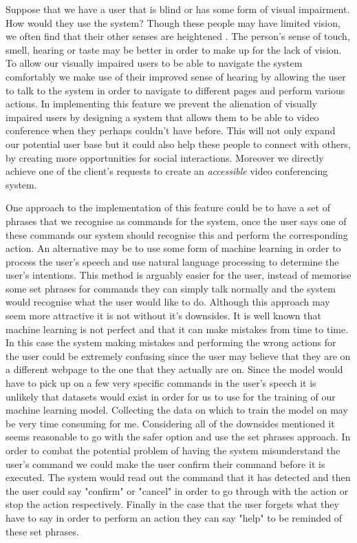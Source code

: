 Suppose that we have a user that is blind or has some form 
of visual impairment. How would they use the system? Though 
these people may have limited vision, we often find that 
their other senses are heightened \cite{blind}. The person's
sense of touch, smell, hearing or taste may be better in order
to make up for the lack of vision. To allow our visually 
impaired users to be able to navigate the system comfortably 
we make use of their improved sense of hearing by allowing the
user to talk to the system in order to navigate to different 
pages and perform various actions. In implementing this 
feature we prevent the alienation of visually impaired users
by designing a system that allows them to be able to video
conference when they perhaps couldn't have before. This will 
not only expand our potential user base but it could also 
help these people to connect with others, by creating more 
opportunities for social interactions. Moreover 
we directly achieve one of the client's requests to create 
an \textit{accessible} video conferencing system. \\
\vspace{0.2cm}

One approach to the implementation of this feature could
be to have a set of phrases that we recognise as commands 
for the system, once 
the user says one of these commands our system should
recognise this and perform the corresponding action. An 
alternative may be to use some form of machine learning in 
order to process the user's speech and use natural language
processing to determine the user's intentions. This method is
arguably easier for the user, instead of memorise some set
phrases for commands they can simply talk normally and the
system would recognise what the user would like to do. 
Although this approach may seem more attractive it is not 
without it's downsides. It is well known that machine 
learning is not perfect and that it can make mistakes from 
time to time. In this case the system making mistakes and
performing the wrong actions for the user could be extremely
confusing since the user may believe that they are on a
different webpage to the one that they actually are on. Since 
the model would have to pick up on a few very specific
commands in the user's speech it is unlikely that datasets 
would exist in order for us to use for the training of our 
machine learning model. Collecting the data on 
which to train the model on may be very time consuming for me.
Considering all of the downsides mentioned it seems 
reasonable to go with the safer option and use the set
phrases approach. In order to combat the potential problem of
having the system misunderstand the user's command we could 
make the user confirm their command before it is executed.
The system would read out the command that it has detected and
then the user could say "confirm" or "cancel" in order to 
go through with the action or stop the action respectively. 
Finally in the case that the user forgets what they have to 
say in order to perform an action they can say "help" to be 
reminded of these set phrases.
\\ \vspace{0.2cm}

